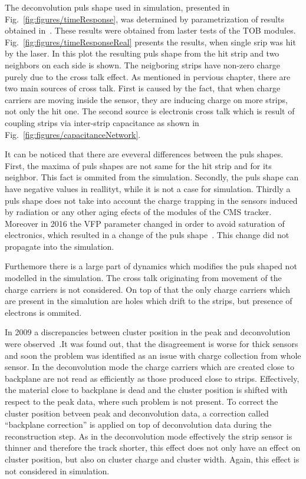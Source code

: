The deconvolution puls shape used in simulation, presented in Fig.~\ref{fig:figures/timeResponse}, was determined by parametrization of results obtained in~\cite{Delaere:1061284}. These results were obtained from laster tests of the TOB modules. Fig.~\ref{fig:figures/timeResponseReal} presents the results, when single srip was hit by the laser. In this plot the resulting puls shape from the hit strip and two neighbors on each side is shown. The neigboring strips have non-zero charge purely due to the cross talk effect. As mentioned in pervious chapter, there are two main sources of cross talk. First is caused by the fact, that when charge carriers are moving inside the sensor, they are inducing charge on more strips, not only the hit one. The second source is electronis cross talk which is result of coupling strips via inter-strip capacitance as shown in Fig.~\ref{fig:figures/capacitanceNetwork}. 


It can be noticed that there are eveveral differences between the puls shapes. First, the maxima of puls shapes are not same for the hit strip and for its neighbor. This fact is ommited from the simulation. Secondly, the puls shape can have negative values in reallityt, while it is not a case for simulation. Thirdly a puls shape does not take into account the charge trapping in the sensors induced by radiation or any other aging efects of the modules of the CMS tracker. Moreover in 2016 the VFP parameter changed in order to avoid saturation of electronics, which resulted in a change of the puls shape~\cite{website:vfp}. This change did not propagate into the simulation.

Furthemore there is a large part of dynamics which modifies the puls shaped not modelled in the simulation. The cross talk originating from movement of the charge carriers is not considered. On top of that the only charge carriers which are present in the simalution are holes which drift to the strips, but presence of electrons is ommited.

In 2009 a discrepancies between cluster position in the peak and deconvolution were observed~\cite{website:backplane}.It was found out, that the disagreement is worse for thick sensors and soon the problem was identified as an issue with charge collection from whole sensor. In the deconvolution mode the charge carriers which are created close to backplane are not read as efficiently as those produced close to strips. Effectively, the material close to backplane is dead and the cluster position is shifted with respect to the peak data, where such problem is not present. To correct the cluster position betveen peak and deconvolution data, a correction called ``backplane correction'' is applied on top of deconvolution data during the reconstruction step. As in the deconvolution mode effectively the strip sensor is thinner and therefore the track shorter, this effect does not only have an effect on cluster position, but also on cluster charge and cluster width. Again, this effect is not considered in simulation.

